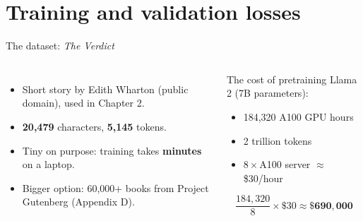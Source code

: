 \documentclass[aspectratio=169]{beamer}
\begin{document}
	\section{Training and validation losses}


	\begin{frame}{The dataset: \emph{The Verdict}}
		\begin{columns}[T]
			\begin{itemize}
				\item Short story by Edith Wharton (public domain), used in Chapter 2.
				\item \textbf{20,479} characters, \textbf{5,145} tokens.
				\item Tiny on purpose: training takes \textbf{minutes} on a laptop.
				\item Bigger option: 60,000+ books from Project Gutenberg (Appendix D).
			\end{itemize}
			\begin{alertblock}{The cost of pretraining}
				\small
				Llama 2 (7B parameters):
				\begin{itemize}
					\item 184,320 A100 GPU hours
					\item 2 trillion tokens
					\item $8\times$A100 server $\approx$ \$30/hour
				\end{itemize}
				\[
				\frac{184{,}320}{8} \times \$30 \approx \mathbf{\$690{,}000}
				\]
			\end{alertblock}
		\end{columns}
	\end{frame}
\end{document}
